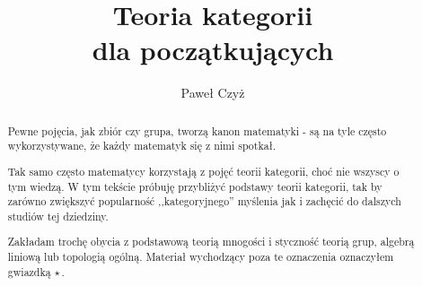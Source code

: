 \documentclass[12pt, notitlepage]{article}
\title{Teoria kategorii\\
\large dla początkujących}
\author{Paweł Czyż}
\theoremstyle{plain}
\theoremstyle{definition}
\theoremstyle{remark}
\newcommand{\starred}{$\star$\,}
\begin{document}
  \maketitle
  \begin{abstract}
    Pewne pojęcia, jak zbiór czy grupa, tworzą kanon matematyki - są na tyle często wykorzystywane, że każdy matematyk się z nimi spotkał.

    Tak samo często matematycy korzystają z pojęć teorii kategorii, choć nie wszyscy o tym wiedzą. W tym tekście próbuję przybliżyć podstawy teorii kategorii, tak by zarówno zwiększyć popularność ,,kategoryjnego'' myślenia jak i zachęcić do dalszych studiów tej dziedziny.

    Zakładam trochę obycia z podstawową teorią mnogości i styczność teorią grup, algebrą liniową lub topologią ogólną. Materiał wychodzący poza te oznaczenia oznaczyłem gwiazdką \starred.
  \end{abstract}

 
 
 
 
 
 

% 
\end{document}
